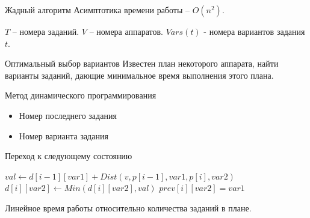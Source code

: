 \documentclass{beamer}
\begin{document}
\begin{frame}{Жадный алгоритм}
Асимптотика времени работы -- $O(n^2)$.

$T$ -- номера заданий. $V$ -- номера аппаратов. $Vars(t)$ - номера вариантов задания $t$.

\end{frame}

\begin{frame}{Оптимальный выбор вариантов}
Известен план некоторого аппарата, найти варианты заданий, дающие минимальное время выполнения этого плана.

Метод динамического программирования
\begin{itemize}
\item Номер последнего задания
\item Номер варианта задания
\end{itemize}

\begin{exampleblock}{Переход к следующему состоянию}

\begin{algorithmic}
\State $val \gets d[i - 1][var1] + Dist(v, p[i - 1], var1, p[i], var2)$
    \State $d[i][var2] \gets Min(d[i][var2], val)$
    \State $prev[i][var2] = var1$
\EndIf
\end{algorithmic}
\end{exampleblock}

Линейное время работы относительно количества заданий в плане.

\end{frame}
\end{document}

